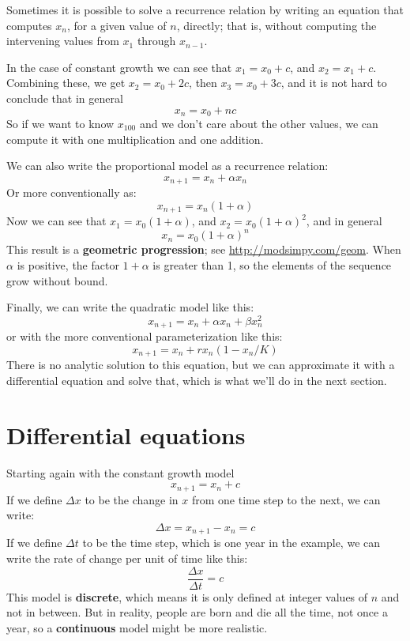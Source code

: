 \documentclass[12pt]{book}
\theoremstyle{exercise}
\begin{document}

Sometimes it is possible to solve a recurrence relation by writing an equation that computes $x_n$, for a given value of $n$, directly; that is, without computing the intervening values from $x_1$ through $x_{n-1}$.

In the case of constant growth we can see that $x_1 = x_0 + c$, and $x_2 = x_1 + c$.  Combining these, we get $x_2 = x_0 + 2c$, then $x_3 = x_0 + 3c$, and it is not hard to conclude that in general
%
\[ x_n = x_0 + nc \]
%
So if we want to know $x_{100}$ and we don't care about the other values, we can compute it with one multiplication and one addition.

We can also write the proportional model as a recurrence relation:
%
\[ x_{n+1} = x_n + \alpha x_n \]
%
Or more conventionally as:
%
\[ x_{n+1} = x_n (1 + \alpha) \]
%
Now we can see that $x_1 = x_0 (1 + \alpha)$, and $x_2 = x_0 (1 + \alpha)^2$, and in general
%
\[ x_n = x_0 (1 + \alpha)^n \]
%
This result is a {\bf geometric progression}; see \url{http://modsimpy.com/geom}.  When $\alpha$ is positive, the factor $1+\alpha$ is greater than 1, so the elements of the sequence grow without bound.


Finally, we can write the quadratic model like this:
%
\[ x_{n+1} = x_n + \alpha x_n + \beta x_n^2 \]
%
or with the more conventional parameterization like this:
%
\[ x_{n+1} = x_n + r x_n (1 - x_n / K) \]
%
There is no analytic solution to this equation, but we can approximate it with a differential equation and solve that, which is what we'll do in the next section.


\section{Differential equations}
\label{diffeq}

Starting again with the constant growth model
%
\[ x_{n+1} = x_n + c \]
%
If we define $\Delta x$ to be the change in $x$ from one time step to the next, we can write:
%
\[ \Delta x = x_{n+1} - x_n = c \]
%
If we define $\Delta t$ to be the time step, which is one year in the example, we can write the rate of change per unit of time like this:
%
\[ \frac{\Delta x}{\Delta t} = c \]
%
This model is {\bf discrete}, which means it is only defined at integer values of $n$ and not in between.  But in reality, people are born and die all the time, not once a year, so a {\bf continuous} model might be more realistic.
\end{document}
